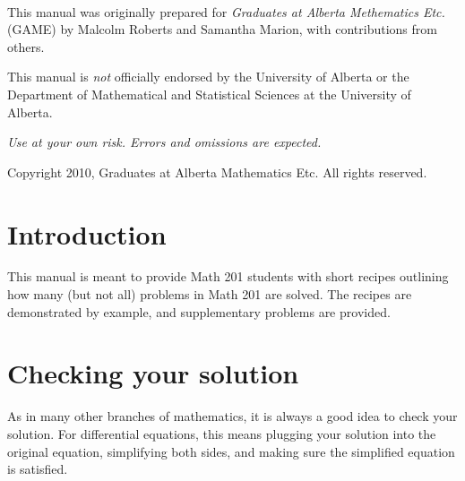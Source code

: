 \documentclass{book}
\begin{document}
\pagestyle{empty}


\newpage\
\vspace{5in}

This manual was originally prepared for \emph{Graduates at Alberta
  Methematics Etc.} (GAME) by Malcolm Roberts and Samantha Marion,
with contributions from others.  \vspace{0.5in}

This manual is \emph{not} officially endorsed by the University of
Alberta or the Department of Mathematical and Statistical Sciences at
the University of Alberta.
\vspace{0.5in}

\emph{Use at your own risk.  Errors and omissions are expected.}
\vspace{0.5in}

Copyright 2010, Graduates at Alberta Mathematics Etc.  All rights
reserved.

\newpage
\tableofcontents

\newpage
\pagestyle{plain}

\section*{Introduction}

This manual is meant to provide Math 201 students with short recipes
outlining how many (but not all) problems in Math 201 are solved.  The
recipes are demonstrated by example, and supplementary problems are
provided.

\section*{Checking your solution}

As in many other branches of mathematics, it is always a good idea to
check your solution.  For differential equations, this means plugging
your solution into the original equation, simplifying both sides, and
making sure the simplified equation is satisfied.
\end{document}
